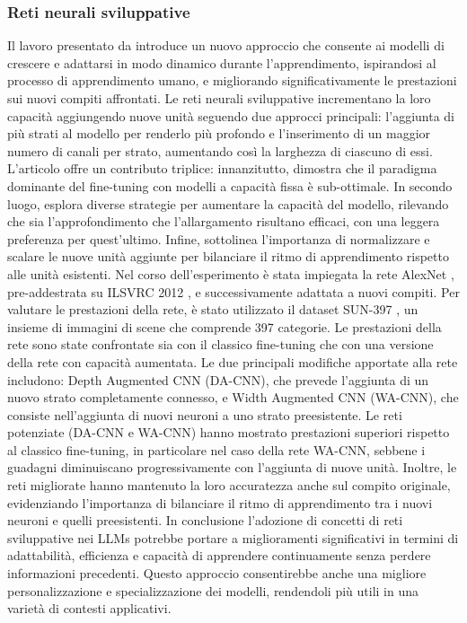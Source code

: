 \subsubsection{Reti neurali sviluppative}
Il lavoro presentato da \cite{DBLP:journals/corr/abs-1907-07844} introduce un nuovo approccio che consente ai modelli di crescere e adattarsi in modo dinamico durante l'apprendimento, ispirandosi al processo di apprendimento umano, e migliorando significativamente le prestazioni sui nuovi compiti affrontati.
Le reti neurali sviluppative incrementano la loro capacità aggiungendo nuove unità seguendo due approcci principali: l'aggiunta di più strati al modello per renderlo più profondo e l'inserimento di un maggior numero di canali per strato, aumentando così la larghezza di ciascuno di essi.
L'articolo offre un contributo triplice: innanzitutto, dimostra che il paradigma dominante del fine-tuning con modelli a capacità fissa è sub-ottimale. In secondo luogo, esplora diverse strategie per aumentare la capacità del modello, rilevando che sia l'approfondimento che l'allargamento risultano efficaci, con una leggera preferenza per quest'ultimo. Infine, sottolinea l'importanza di normalizzare e scalare le nuove unità aggiunte per bilanciare il ritmo di apprendimento rispetto alle unità esistenti.
Nel corso dell'esperimento è stata impiegata la rete AlexNet \cite{krizhevsky2017imagenet}, pre-addestrata su ILSVRC 2012 \cite{russakovsky2015imagenet}, e successivamente adattata a nuovi compiti. Per valutare le prestazioni della rete, è stato utilizzato il dataset SUN-397 \cite{xiao2016sun}, un insieme di immagini di scene che comprende 397 categorie. Le prestazioni della rete sono state confrontate sia con il classico fine-tuning che con una versione della rete con capacità aumentata. Le due principali modifiche apportate alla rete includono: Depth Augmented CNN (DA-CNN), che prevede l'aggiunta di un nuovo strato completamente connesso, e Width Augmented CNN (WA-CNN), che consiste nell'aggiunta di nuovi neuroni a uno strato preesistente.
Le reti potenziate (DA-CNN e WA-CNN) hanno mostrato prestazioni superiori rispetto al classico fine-tuning, in particolare nel caso della rete WA-CNN, sebbene i guadagni diminuiscano progressivamente con l'aggiunta di nuove unità. Inoltre, le reti migliorate hanno mantenuto la loro accuratezza anche sul compito originale, evidenziando l'importanza di bilanciare il ritmo di apprendimento tra i nuovi neuroni e quelli preesistenti.
In conclusione l'adozione di concetti di reti sviluppative nei LLMs potrebbe portare a miglioramenti significativi in termini di adattabilità, efficienza e capacità di apprendere continuamente senza perdere informazioni precedenti. Questo approccio consentirebbe anche una migliore personalizzazione e specializzazione dei modelli, rendendoli più utili in una varietà di contesti applicativi.


